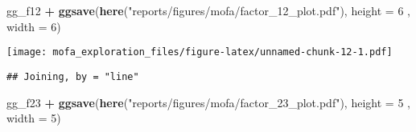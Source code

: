 \documentclass[
]{article}
\newenvironment{Shaded}{\begin{snugshade}}{\end{snugshade}}
\newcommand{\DataTypeTok}[1]{\textcolor[rgb]{0.13,0.29,0.53}{#1}}
\newcommand{\DecValTok}[1]{\textcolor[rgb]{0.00,0.00,0.81}{#1}}
\newcommand{\KeywordTok}[1]{\textcolor[rgb]{0.13,0.29,0.53}{\textbf{#1}}}
\newcommand{\NormalTok}[1]{#1}
\newcommand{\OperatorTok}[1]{\textcolor[rgb]{0.81,0.36,0.00}{\textbf{#1}}}
\newcommand{\StringTok}[1]{\textcolor[rgb]{0.31,0.60,0.02}{#1}}
\begin{document}
\begin{Shaded}
\begin{Highlighting}[]
\NormalTok{gg_f12 }\OperatorTok{+}\StringTok{ }\KeywordTok{ggsave}\NormalTok{(}\KeywordTok{here}\NormalTok{(}\StringTok{"reports/figures/mofa/factor_12_plot.pdf"}\NormalTok{), }\DataTypeTok{height =} \DecValTok{6}\NormalTok{ , }\DataTypeTok{width =} \DecValTok{6}\NormalTok{)}
\end{Highlighting}
\end{Shaded}

\texttt{[image: mofa\_exploration\_files/figure-latex/unnamed-chunk-12-1.pdf]}

\begin{Shaded}
\end{Shaded}

\begin{verbatim}
## Joining, by = "line"
\end{verbatim}

\begin{Shaded}
\begin{Highlighting}[]
\NormalTok{gg_f23 }\OperatorTok{+}\StringTok{ }\KeywordTok{ggsave}\NormalTok{(}\KeywordTok{here}\NormalTok{(}\StringTok{"reports/figures/mofa/factor_23_plot.pdf"}\NormalTok{), }\DataTypeTok{height =} \DecValTok{5}\NormalTok{ , }\DataTypeTok{width =} \DecValTok{5}\NormalTok{)}
\end{Highlighting}
\end{Shaded}
\end{document}
